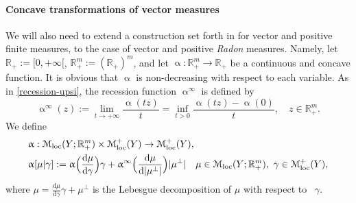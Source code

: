 \documentclass[11pt,reqno]{amsart}
\numberwithin{equation}{section}
\newcommand{\R}{\mathbb{R}}
\newcommand{\dd}{\mathrm{d}}
\theoremstyle{definition}
\def\dd{\mathrm{d}}
\newcommand{\pinfty}{{+\infty}}
\def\Aalpha{\upalpha}
\newcommand{\Mloc}{\mathcal{M}_{\mathrm{loc}}}
\numberwithin{equation}{section}
\begin{document}
\paragraph{\bf Concave transformations of vector measures}
We will also need to extend  a construction set forth in \cite[Sec.\ 2.3]{PRST22}
for vector and positive finite measures, to  the case of vector and positive \emph{Radon} measures. Namely,
 let  $\R_+:=[0,\pinfty[$, $\R^m_+:=(\R_+)^m$, and let
$\upalpha:\R^m_+\to\R_+$ be a continuous and concave function. It is
obvious that $\upalpha$ is non-decreasing with respect to each variable.
As in \eqref{recession-upsi}, the recession function $\upalpha^\infty$ is defined
by
\begin{equation}
  \label{eq:1}
  \upalpha^\infty(z):=\lim_{t\to\pinfty}\frac{\upalpha(tz)}t=\inf_{t>0}\frac{\upalpha(tz)-\upalpha(0)}t,\quad
  z\in \R^m_+.
\end{equation}
We define 
\begin{equation}
  \label{alpha-mu-gamma}
  \begin{aligned}
  &
  \Aalpha:\Mloc(Y;\R^m_+)\times\Mloc^+(Y)\to\Mloc^+(Y), 
  \\
  &
  \Aalpha[\mu|\gamma]:=
  \upalpha\Bigl(\frac{\dd\mu}{\dd\gamma}\Bigr)\gamma+
  \upalpha^\infty\Bigl(\frac{\dd\mu}{\dd
    |\mu^\perp|}\Bigr)|\mu^\perp|\quad
  \mu\in \Mloc(Y;\R^m_+),\ \gamma\in \Mloc^+(Y),
  \end{aligned}
\end{equation}
where  $\mu=\frac{\dd\mu}{\dd\gamma}\gamma+\mu^\perp$ is the
Lebesgue decomposition of $\mu$ with respect to ~$\gamma$. 
\end{document}
